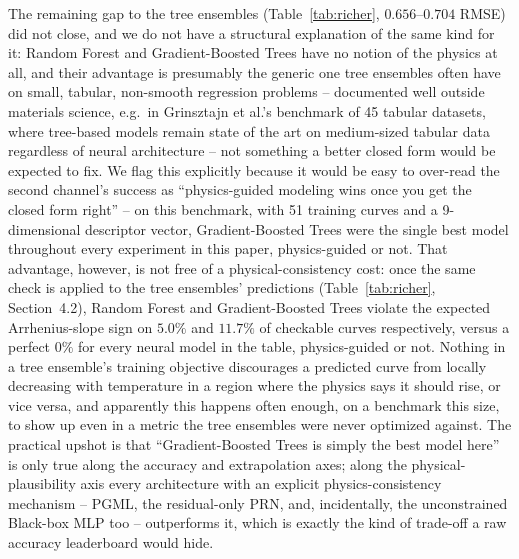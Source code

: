 \documentclass[11pt]{article}
\begin{document}
The remaining gap to the tree ensembles (Table~\ref{tab:richer}, $0.656$--$0.704$ RMSE) did not close, and we do not have a structural explanation of the same kind for it: Random Forest and Gradient-Boosted Trees have no notion of the physics at all, and their advantage is presumably the generic one tree ensembles often have on small, tabular, non-smooth regression problems -- documented well outside materials science, e.g.\ in Grinsztajn et al.'s benchmark of 45 tabular datasets, where tree-based models remain state of the art on medium-sized tabular data regardless of neural architecture \citep{grinsztajn2022tree} -- not something a better closed form would be expected to fix. We flag this explicitly because it would be easy to over-read the second channel's success as ``physics-guided modeling wins once you get the closed form right'' -- on this benchmark, with 51 training curves and a 9-dimensional descriptor vector, Gradient-Boosted Trees were the single best model throughout every experiment in this paper, physics-guided or not. That advantage, however, is not free of a physical-consistency cost: once the same check is applied to the tree ensembles' predictions (Table~\ref{tab:richer}, Section~4.2), Random Forest and Gradient-Boosted Trees violate the expected Arrhenius-slope sign on $5.0\%$ and $11.7\%$ of checkable curves respectively, versus a perfect $0\%$ for every neural model in the table, physics-guided or not. Nothing in a tree ensemble's training objective discourages a predicted curve from locally decreasing with temperature in a region where the physics says it should rise, or vice versa, and apparently this happens often enough, on a benchmark this size, to show up even in a metric the tree ensembles were never optimized against. The practical upshot is that ``Gradient-Boosted Trees is simply the best model here'' is only true along the accuracy and extrapolation axes; along the physical-plausibility axis every architecture with an explicit physics-consistency mechanism -- PGML, the residual-only PRN, and, incidentally, the unconstrained Black-box MLP too -- outperforms it, which is exactly the kind of trade-off a raw accuracy leaderboard would hide.
\end{document}
